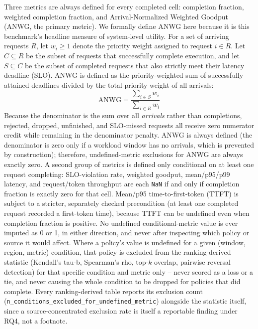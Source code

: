 Three metrics are always defined for every completed cell: completion
fraction, weighted completion fraction, and Arrival-Normalized Weighted Goodput (ANWG, the primary metric). We formally define ANWG here because it is this benchmark's headline measure of system-level utility. For a set of arriving requests $R$, let $w_i \ge 1$ denote the priority weight assigned to request $i \in R$. Let $C \subseteq R$ be the subset of requests that successfully complete execution, and let $S \subseteq C$ be the subset of completed requests that also strictly meet their latency deadline (SLO). ANWG is defined as the priority-weighted sum of successfully attained deadlines divided by the total priority weight of all arrivals:
\begin{equation}
\text{ANWG} = \frac{\sum_{i \in S} w_i}{\sum_{i \in R} w_i}
\end{equation}
Because the denominator is the sum over all \emph{arrivals} rather than completions, rejected, dropped, unfinished, and SLO-missed requests all receive zero numerator credit while remaining in the denominator penalty. ANWG is always defined (the denominator is zero only if a workload window has no arrivals, which is prevented by construction); therefore, undefined-metric exclusions for ANWG are always exactly zero. A second group of metrics is defined
only conditional on at least one request completing: SLO-violation rate,
weighted goodput, mean/p95/p99 latency, and request/token throughput are
each \texttt{NaN} if and only if completion fraction is exactly zero for
that cell. Mean/p95 time-to-first-token (TTFT) is subject to a stricter,
separately checked precondition (at least one completed request recorded a
first-token time), because TTFT can be undefined even when completion
fraction is positive. No undefined conditional-metric value is ever imputed
as 0 or 1, in either direction, and never after inspecting which policy or
source it would affect. Where a policy's value is undefined for a given
(window, region, metric) condition, that policy is excluded from the
ranking-derived statistic (Kendall's tau-b, Spearman's rho, top-$k$
overlap, pairwise reversal detection) for that specific condition and
metric only -- never scored as a loss or a tie, and never causing the whole
condition to be dropped for policies that did complete. Every
ranking-derived table reports its exclusion count
(\texttt{n\_conditions\_excluded\_for\_undefined\_metric}) alongside the
statistic itself, since a source-concentrated exclusion rate is itself a
reportable finding under RQ4, not a footnote.

